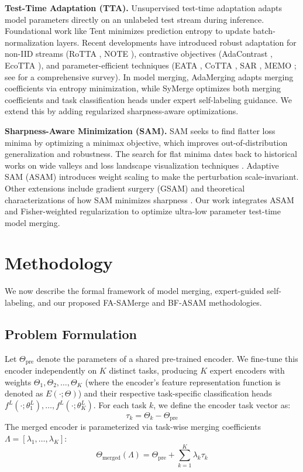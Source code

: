 \documentclass{article}
\theoremstyle{plain}
\theoremstyle{definition}
\theoremstyle{remark}
\begin{document}
\textbf{Test-Time Adaptation (TTA).} Unsupervised test-time adaptation adapts model parameters directly on an unlabeled test stream during inference. Foundational work like Tent \cite{Wang2021} minimizes prediction entropy to update batch-normalization layers. Recent developments have introduced robust adaptation for non-IID streams (RoTTA \cite{Yuan2023}, NOTE \cite{Gong2022}), contrastive objectives (AdaContrast \cite{Chen2022}, EcoTTA \cite{Song2023}), and parameter-efficient techniques (EATA \cite{Niu2022}, CoTTA \cite{Wang2022continual}, SAR \cite{Niu2023}, MEMO \cite{Zhang2022memo}; see \cite{Liang2023survey} for a comprehensive survey). In model merging, AdaMerging \cite{Yang2024} adapts merging coefficients via entropy minimization, while SyMerge \cite{Jung2025} optimizes both merging coefficients and task classification heads under expert self-labeling guidance. We extend this by adding regularized sharpness-aware optimizations.

\textbf{Sharpness-Aware Minimization (SAM).} SAM \cite{Foret2021} seeks to find flatter loss minima by optimizing a minimax objective, which improves out-of-distribution generalization and robustness. The search for flat minima dates back to historical works on wide valleys \cite{Hochreiter1997, Chaudhari2017} and loss landscape visualization techniques \cite{Li2018}. Adaptive SAM (ASAM) \cite{Kwon2021} introduces weight scaling to make the perturbation scale-invariant. Other extensions include gradient surgery (GSAM) \cite{Zhuang2022} and theoretical characterizations of how SAM minimizes sharpness \cite{Andriushchenko2022}. Our work integrates ASAM and Fisher-weighted regularization to optimize ultra-low parameter test-time model merging.

\section{Methodology}
\label{sec:method}
We now describe the formal framework of model merging, expert-guided self-labeling, and our proposed FA-SAMerge and BF-ASAM methodologies.

\subsection{Problem Formulation}
Let $\Theta_{\text{pre}}$ denote the parameters of a shared pre-trained encoder. We fine-tune this encoder independently on $K$ distinct tasks, producing $K$ expert encoders with weights $\Theta_1, \Theta_2, \dots, \Theta_K$ (where the encoder's feature representation function is denoted as $E(\cdot; \Theta)$) and their respective task-specific classification heads $f^L(\cdot; \theta_1^L), \dots, f^L(\cdot; \theta_K^L)$. For each task $k$, we define the encoder task vector as:
\begin{equation}
    \tau_k = \Theta_k - \Theta_{\text{pre}}
\end{equation}
The merged encoder is parameterized via task-wise merging coefficients $\Lambda = [\lambda_1, \dots, \lambda_K]$:
\begin{equation}
    \Theta_{\text{merged}}(\Lambda) = \Theta_{\text{pre}} + \sum_{k=1}^K \lambda_k \tau_k
\end{equation}
\end{document}
